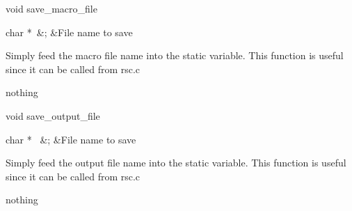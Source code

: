 \begin{Function}{void }{save\_macro\_file}
  \begin{Arguments}
    char *\ 	&;	&File name to save
  \end{Arguments}%
  Simply feed the macro file name into the static variable.
  This function is useful since it can be called from rsc.c
  \begin{Result}
    nothing
  \end{Result}
\end{Function}
\begin{Function}{void }{save\_output\_file}
  \begin{Arguments}
    char * \ 	&;	&File name to save
  \end{Arguments}%
  Simply feed the output file name into the static variable.
  This function is useful since it can be called from rsc.c
  \begin{Result}
    nothing
  \end{Result}
\end{Function}
